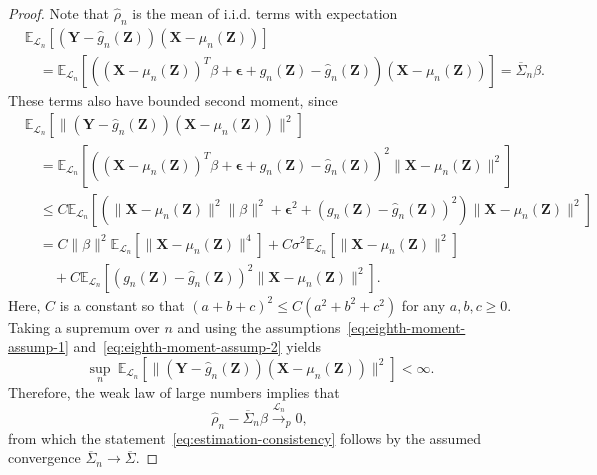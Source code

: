 \documentclass[12pt]{article}
\theoremstyle{definition}
\theoremstyle{remark}
\newcommand{\prx}{\bm X}
\newcommand{\prz}{\bm Z}
\newcommand{\pry}{{\bm Y}}
\newcommand{\peps}{\bm \epsilon}
\begin{document}
\begin{proof}

Note that $\widehat \rho_n$ is the mean of i.i.d. terms with expectation 
\begin{equation}
	\begin{split}
		&\mathbb E_{\mathcal L_n}[(\pry - \widehat g_n(\prz))(\prx - \mu_n(\prz))]  \\
		&\quad = \mathbb E_{\mathcal L_n}[((\prx - \mu_n(\prz))^T\beta + \peps + g_n(\prz) - \widehat g_n(\prz))(\prx - \mu_n(\prz))] = \overline \Sigma_n \beta.
	\end{split}
\end{equation}
These terms also have bounded second moment, since
\begin{equation}
	\begin{split}
		&\mathbb E_{\mathcal L_n}[\|(\pry - \widehat g_n(\prz))(\prx - \mu_n(\prz))\|^2] \\
		&\quad= 	
		\mathbb E_{\mathcal L_n}[((\prx - \mu_n(\prz))^T\beta + \peps + g_n(\prz) - \widehat g_n(\prz))^2\|\prx - \mu_n(\prz)\|^2] \\
		&\quad\leq
		C\mathbb E_{\mathcal L_n}[(\|\prx - \mu_n(\prz)\|^2\|\beta\|^2 + \peps^2 + (g_n(\prz) - \widehat g_n(\prz))^2)\|\prx - \mu_n(\prz)\|^2] \\
		&\quad=
		C\|\beta\|^2\mathbb E_{\mathcal L_n}[\|\prx - \mu_n(\prz)\|^4] + C\sigma^2\mathbb E_{\mathcal L_n}[\|\prx - \mu_n(\prz)\|^2] \\
		&\quad \quad + C\mathbb E_{\mathcal L_n}[(g_n(\prz) - \widehat g_n(\prz))^2\|\prx - \mu_n(\prz)\|^2].
	\end{split}
\end{equation}	
Here, $C$ is a constant so that $(a+b+c)^2 \leq C(a^2 + b^2 + c^2)$ for any $a, b, c \geq 0$.
Taking a supremum over $n$ and using the assumptions~\eqref{eq:eighth-moment-assump-1} and~\eqref{eq:eighth-moment-assump-2} yields
\begin{equation}
	\sup_n\ \mathbb E_{\mathcal L_n}[\|(\pry - \widehat g_n(\prz))(\prx - \mu_n(\prz))\|^2] < \infty.
\end{equation}
Therefore, the weak law of large numbers implies that
\begin{equation}
	\widehat \rho_n - \overline \Sigma_n \beta \overset{\mathcal L_n}\rightarrow _p  0,
\end{equation}
from which the statement~\eqref{eq:estimation-consistency} follows by the assumed convergence $\overline \Sigma_n \rightarrow \overline \Sigma$. 
	
\end{proof}
\end{document}
